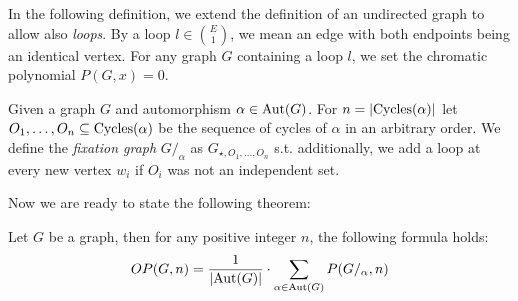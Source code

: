 In the following definition, we extend the definition of an undirected graph to allow also \textit{loops}. By a loop $l \in \binom{E}{1}$, we mean an edge with both endpoints being an identical vertex. For any graph $G$ containing a loop $l$, we set the chromatic polynomial $P(G,x) = 0$.

\begin{defn}
    Given a graph $G$ and automorphism $\alpha \in \operatorname{Aut}(G)$. For $n = \left|{\operatorname{Cycles}(\alpha)}\right|$ let $O_1, \ldots ,O_n \subseteq \operatorname{Cycles}(\alpha)$ be the sequence of cycles of $\alpha$ in an arbitrary order. We define the \emph{fixation graph} $G /_{\alpha}$ as $G_{\star,O_1, \ldots , O_n}$ s.t. additionally, we add a loop at every new vertex $w_i$ if $O_i$ was not an independent set.
\end{defn}

Now we are ready to state the following theorem:

\begin{thm} \label{thm:count-orb-chrompoly}
    Let $G$ be a graph, then for any positive integer $n$, the following formula holds:
    \begin{equation} \label{eqn:oribtal-chrompoly}
        OP(G,n) = \frac{1}{\left|{\operatorname{Aut}(G)}\right|} \cdot \sum_{\alpha \in \operatorname{Aut}(G)}P(G/_\alpha,n)
    \end{equation}
\end{thm}

